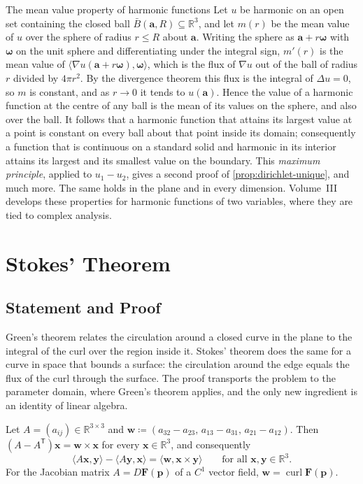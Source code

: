 \begin{note}{The mean value property of harmonic functions}
Let $u$ be harmonic on an open set containing the closed ball $\bar B(\mathbf a,R)\subseteq\mathbb R^3$, and let $m(r)$ be the mean value of $u$ over the sphere of radius $r\le R$ about $\mathbf a$. Writing the sphere as $\mathbf a+r\boldsymbol\omega$ with $\boldsymbol\omega$ on the unit sphere and differentiating under the integral sign, $m'(r)$ is the mean value of $\langle\nabla u(\mathbf a+r\boldsymbol\omega),\boldsymbol\omega\rangle$, which is the flux of $\nabla u$ out of the ball of radius $r$ divided by $4\pi r^2$. By the divergence theorem this flux is the integral of $\Delta u=0$, so $m$ is constant, and as $r\to0$ it tends to $u(\mathbf a)$. Hence the value of a harmonic function at the centre of any ball is the mean of its values on the sphere, and also over the ball. It follows that a harmonic function that attains its largest value at a point is constant on every ball about that point inside its domain; consequently a function that is continuous on a standard solid and harmonic in its interior attains its largest and its smallest value on the boundary. This \emph{maximum principle}, applied to $u_1-u_2$, gives a second proof of \cref{prop:dirichlet-unique}, and much more. The same holds in the plane and in every dimension. Volume~III develops these properties for harmonic functions of two variables, where they are tied to complex analysis.
\end{note}

\section{Stokes' Theorem}
\label{sec:stokes}

\subsection{Statement and Proof}

Green's theorem relates the circulation around a closed curve in the plane to the integral of the curl over the region inside it. Stokes' theorem does the same for a curve in space that bounds a surface: the circulation around the edge equals the flux of the curl through the surface. The proof transports the problem to the parameter domain, where Green's theorem applies, and the only new ingredient is an identity of linear algebra.

\begin{lemma}
\label{lem:antisymmetric-curl}
Let $A=(a_{ij})\in\mathbb R^{3\times3}$ and $\mathbf w\coloneqq(a_{32}-a_{23},\,a_{13}-a_{31},\,a_{21}-a_{12})$. Then $(A-A^{\mathsf T})\mathbf x=\mathbf w\times\mathbf x$ for every $\mathbf x\in\mathbb R^3$, and consequently
\[
\langle A\mathbf x,\mathbf y\rangle-\langle A\mathbf y,\mathbf x\rangle=\langle\mathbf w,\mathbf x\times\mathbf y\rangle\qquad\text{for all }\mathbf x,\mathbf y\in\mathbb R^3 .
\]
For the Jacobian matrix $A=D\mathbf F(\mathbf p)$ of a $C^1$ vector field, $\mathbf w=\operatorname{curl}\mathbf F(\mathbf p)$.
\end{lemma}

